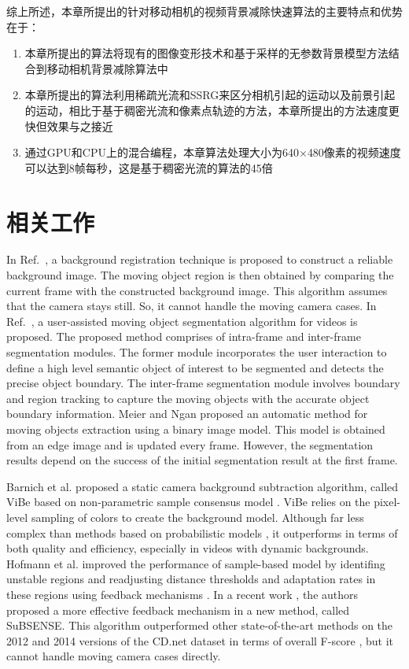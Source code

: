 综上所述，本章所提出的针对移动相机的视频背景减除快速算法的主要特点和优势在于：
\begin{enumerate}
\item 本章所提出的算法将现有的图像变形技术和基于采样的无参数背景模型方法结合到移动相机背景减除算法中
\item 本章所提出的算法利用稀疏光流和SSRG来区分相机引起的运动以及前景引起的运动，相比于基于稠密光流和像素点轨迹的方法，本章所提出的方法速度更快但效果与之接近
\item 通过GPU和CPU上的混合编程，本章算法处理大小为640$\times$480像素的视频速度可以达到8帧每秒，这是基于稠密光流的算法\cite{gbsuperpixel}的45倍
\end{enumerate}


 \section{相关工作}
 \label{ch4:sec:relatedWorks}
 In Ref.~, a background registration technique is proposed to construct a reliable background image. The moving object region is then obtained by comparing the current frame with the constructed background image. This algorithm assumes that the camera stays still. So, it cannot handle the moving camera cases. In Ref.~, a user-assisted moving object segmentation algorithm for videos is proposed. The proposed method comprises of intra-frame and inter-frame segmentation modules. The former module incorporates the user interaction to define a high level semantic object of interest to be segmented and detects the precise object boundary. The inter-frame segmentation module involves boundary and region tracking to capture the moving objects with the accurate object boundary information.  Meier and Ngan\cite{Meier1998Automatic} proposed an automatic method for moving objects extraction using a binary image model. This model is obtained from an edge image and is updated every frame. However, the segmentation results depend on the success of the initial segmentation result at the first frame. \par
Barnich et al. proposed a static camera background subtraction algorithm, called ViBe based on non-parametric sample consensus model \cite{Barnich2011ViBe}. ViBe relies on the pixel-level sampling of colors to create the background model. Although far less complex than methods based on probabilistic models \cite{GMMPAMI}, it outperforms in terms of both quality and efficiency, especially in videos with dynamic backgrounds. Hofmann et al. improved the performance of sample-based model by identifing unstable regions and readjusting distance thresholds and adaptation rates in these regions using feedback mechanisms \cite{pbas} . In a recent work \cite{subsenseTIP}, the authors proposed a more effective feedback mechanism in a new method, called SuBSENSE. This algorithm outperformed other state-of-the-art methods on the 2012 and 2014 versions of the CD.net dataset in terms of overall F-score \cite{CD2014}, but it cannot handle moving camera cases directly. \par

